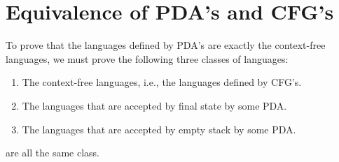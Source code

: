 \documentclass[]{article}
\begin{document}
\section*{Equivalence of PDA's and CFG's}
  To prove that the languages defined by PDA's are exactly the context-free
  languages, we must prove the following three classes of languages:
    \begin{enumerate}
      \item The context-free languages, i.e., the languages defined by CFG's.
      \item The languages that are accepted by final state by some PDA.
      \item The languages that are accepted by empty stack by some PDA.
    \end{enumerate}
  are all the same class.
\end{document}

